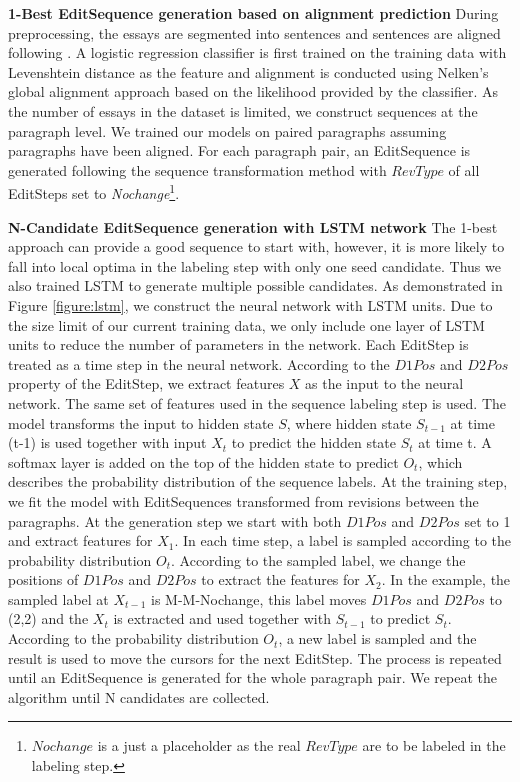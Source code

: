 \documentclass[11pt]{article}
\begin{document}
\textbf{1-Best EditSequence generation based on alignment prediction} During preprocessing, the essays are segmented into sentences and sentences are aligned following \cite{zhang-litman:2014:W14-18}. A logistic regression classifier is first trained on the training data with Levenshtein distance as the feature and alignment is conducted using Nelken's global alignment approach \cite{nelken2006towards} based on the likelihood provided by the classifier. As the number of essays in the dataset is limited, we construct sequences at the paragraph level. We trained our models on paired paragraphs assuming paragraphs have been aligned. For each paragraph pair, an EditSequence is generated following the sequence transformation method with $RevType$ of all EditSteps set to \textit{Nochange}\footnote{$Nochange$ is a just a placeholder as the real $RevType$ are to be labeled in the labeling step.}.

\textbf{N-Candidate EditSequence generation with LSTM network} The 1-best approach can provide a good sequence to start with, however, it is more likely to fall into local optima in the labeling step with only one seed candidate. Thus we also trained LSTM to generate multiple possible candidates. As demonstrated in Figure \ref{figure:lstm}, we construct the neural network with LSTM units. Due to the size limit of our current training data, we only include one layer of LSTM units to reduce the number of parameters in the network. Each EditStep is treated as a time step in the neural network. According to the $D1Pos$ and $D2Pos$ property of the EditStep, we extract features $X$ as the input to the neural network. The same set of features used in the sequence labeling step is used. The model transforms the input to hidden state $S$, where hidden state $S_{t-1}$ at time (t-1) is used together with input $X_{t}$ to predict the hidden state $S_{t}$ at time t. A softmax layer is added on the top of the hidden state to predict $O_{t}$, which describes the probability distribution of the sequence labels. At the training step, we fit the model with EditSequences transformed from revisions between the paragraphs. At the generation step we start with both $D1Pos$ and $D2Pos$ set to 1 and extract features for $X_1$. In each time step, a label is sampled according to the probability distribution $O_t$.  According to the sampled label, we change the positions of $D1Pos$ and $D2Pos$ to extract the features for $X_2$. In the example, the sampled label at $X_{t-1}$ is M-M-Nochange, this label moves $D1Pos$ and $D2Pos$ to (2,2) and the $X_t$ is extracted and used together with $S_{t-1}$ to predict $S_{t}$. According to the probability distribution $O_{t}$, a new label is sampled and the result is used to move the cursors for the next EditStep. The process is repeated until an EditSequence is generated for the whole paragraph pair. We repeat the algorithm until N candidates are collected.  
\end{document}
